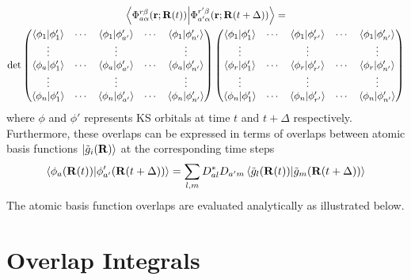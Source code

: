 \begin{multline}
    \ip{\Phi_{a\alpha}^{r\beta}(\mathbf{r};\mathbf{R}(t))}{\Phi_{a'\alpha}^{r'\beta}(\mathbf{r};\mathbf{R}(t+\Delta))} = \\ \text{det}
    \begin{pmatrix}
        \ip{\phi_1}{\phi_1'} & \cdots & \ip{\phi_1}{\phi_{a'}'} & \cdots & \ip{\phi_1}{\phi_{n'}'} \\
        \vdots & & \vdots & & \vdots \\
        \ip{\phi_a}{\phi_1'} & \cdots & \ip{\phi_a}{\phi_{a'}'} & \cdots & \ip{\phi_a}{\phi_{n'}'} \\
        \vdots & & \vdots & & \vdots \\
        \ip{\phi_n}{\phi_1'} & \cdots & \ip{\phi_n}{\phi_{a'}'} & \cdots & \ip{\phi_n}{\phi_{n'}'}
    \end{pmatrix}
    \begin{pmatrix}
        \ip{\phi_1}{\phi_1'} & \cdots & \ip{\phi_1}{\phi_{r'}'} & \cdots & \ip{\phi_1}{\phi_{n'}'} \\
        \vdots & & \vdots & & \vdots \\
        \ip{\phi_r}{\phi_1'} & \cdots & \ip{\phi_r}{\phi_{r'}'} & \cdots & \ip{\phi_r}{\phi_{n'}'} \\
        \vdots & & \vdots & & \vdots \\
        \ip{\phi_n}{\phi_1'} & \cdots & \ip{\phi_n}{\phi_{r'}'} & \cdots & \ip{\phi_n}{\phi_{n'}'}
    \end{pmatrix}
\end{multline}
where $\phi$ and $\phi'$ represents KS orbitals at time $t$ and $t+\Delta$ respectively. Furthermore, these overlaps can be expressed in terms of overlaps between atomic basis functions ${\ket{\tilde{g}_i(\mathbf{R})}}$ at the corresponding time steps
\begin{equation}\label{ko_overlap}
\ip{\phi_a(\mathbf{R}(t))}{\phi'_{a'}(\mathbf{R}(t+\Delta))} = \sum_{l,m}D^*_{al}D_{a'm}\ip{\tilde{g}_l(\mathbf{R}(t))}{\tilde{g}_m(\mathbf{R}(t+\Delta))}
\end{equation}
The atomic basis function overlaps are evaluated analytically as illustrated below. 

\section{Overlap Integrals}


